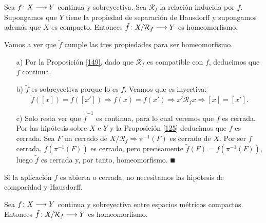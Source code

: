\documentclass[GTS.tex]{subfiles}
\begin{document}
\begin{prop}
Sea $f\colon{X}\longrightarrow{Y}$ continua y sobreyectiva. Sea $\mathcal{R}_f$ la relación inducida por $f$. Supongamos que $Y$ tiene la propiedad de separación de Hausdorff y supongamos además que $X$ es compacto. Entonces $\tilde{f}\colon{X/\mathcal{R}_f}\longrightarrow{Y}$ es homeomorfismo.
\end{prop}
\begin{dem}
Vamos a ver que $\tilde{f}$ cumple las tres propiedades para ser homeomorfismo.
\begin{enumerate}
\item[a)] Por la Proposición \ref{149}, dado que $\mathcal{R}_f$ es compatible con $f$, deducimos que $\tilde{f}$ continua.
\item[b)] $\tilde{f}$ es sobreyectiva porque lo es $f$. Veamos que es inyectiva:
\begin{equation*}
\tilde{f}([x])=\tilde{f}([x'])\Rightarrow f(x)=f(x')\Rightarrow x'\mathcal{R}_f x\Rightarrow [x]=[x'].
\end{equation*}
\item[c)] Solo resta ver que $\tilde{f}^{-1}$ es continua, para lo cual veremos que $\tilde{f}$ es cerrada. Por las hipótesis sobre $X$ e $Y$ y la Proposición \ref{125} deducimos que $f$ es cerrada. Sea $F$ un cerrado de $X/\mathcal{R}_f\Rightarrow\pi^{-1}(F)$ es cerrado de $X$. Por ser $f$ cerrada, $f(\pi^{-1}(F))$ es cerrado, pero precisamente $\tilde{f}(F)=f(\pi^{-1}(F))$, luego $\tilde{f}$ es cerrada y, por tanto, homeomorfismo. 
{$\QED$}
\end{enumerate}

\end{dem}
\begin{nota}
Si la aplicación $f$ es abierta o cerrada, no necesitamos las hipótesis de compacidad y Hausdorff.
\end{nota}
\begin{coro} Sea $f\colon{X}\longrightarrow{Y}$ continua y sobreyectiva entre espacios métricos compactos. Entonces $\tilde{f}\colon{X/\mathcal{R}_f}\longrightarrow{Y}$ es homeomorfismo.
\end{coro}
\end{document}
